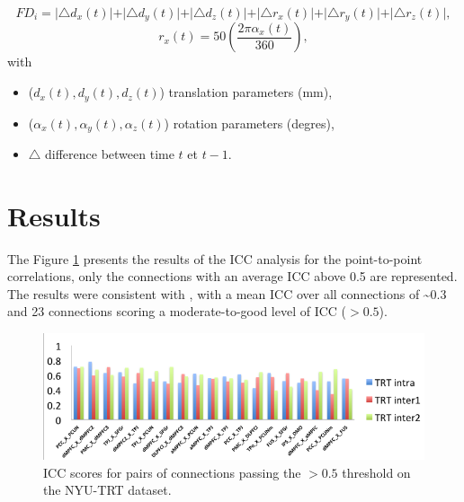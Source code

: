 \documentclass[authoryear]{elsarticle}
\begin{document}
\begin{equation}
    FD_{i} = \vert \triangle d_{x}(t) \vert + \vert \triangle d_{y}(t) \vert + \vert \triangle d_{z}(t) \vert + \vert \triangle r_x(t) \vert + \vert \triangle r_y(t) \vert + \vert \triangle r_z(t) \vert,
\end{equation}
\begin{equation}
  r_x(t) = 50\left(\frac{2\pi\alpha_x(t)}{360}\right),
\end{equation}
with 
\begin{itemize}
 \item ($d_x(t),d_{y}(t),d_{z}(t)$) translation parameters (mm),
 \item ($\alpha_x(t),\alpha_y(t),\alpha_z(t)$) rotation parameters (degres),
 \item $\triangle$ difference between time $t$ et $t-1$.
\end{itemize}

\section{Results}

The Figure \ref{fig_icc} presents the results of the ICC analysis for the point-to-point correlations, 
only the connections with an average ICC above 0.5 are represented. The results were consistent with \citep{Shehzad2009}, with a mean ICC over all connections of \textasciitilde0.3 and 23 connections scoring a moderate-to-good level of ICC ($>0.5$). 

\begin{figure}[H]
\begin{center}
\includegraphics[width=\linewidth]{../figures/fig_icc.png}
\end{center}
\caption[ICC scores]{
  ICC scores for pairs of connections passing the $>0.5$ threshold on the NYU-TRT dataset.
}
\label{fig_icc}
\end{figure}
\end{document}
